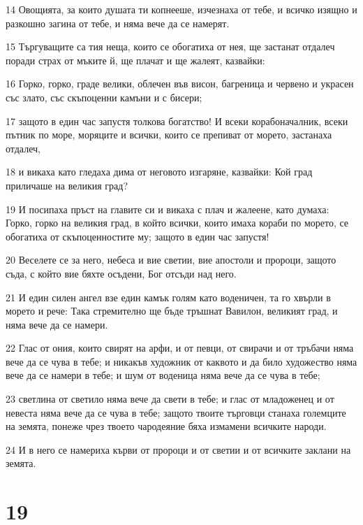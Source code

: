 \par 14 Овощията, за които душата ти копнееше, изчезнаха от тебе, и всичко изящно и разкошно загина от тебе, и няма вече да се намерят.
\par 15 Търгуващите са тия неща, които се обогатиха от нея, ще застанат отдалеч поради страх от мъките й, ще плачат и ще жалеят, казвайки:
\par 16 Горко, горко, граде велики, облечен във висон, багреница и червено и украсен със злато, със скъпоценни камъни и с бисери;
\par 17 защото в един час запустя толкова богатство! И всеки корабоначалник, всеки пътник по море, моряците и всички, които се препиват от морето, застанаха отдалеч,
\par 18 и викаха като гледаха дима от неговото изгаряне, казвайки: Кой град приличаше на великия град?
\par 19 И посипаха пръст на главите си и викаха с плач и жалеене, като думаха: Горко, горко на великия град, в който всички, които имаха кораби по морето, се обогатиха от скъпоценностите му; защото в един час запустя!
\par 20 Веселете се за него, небеса и вие светии, вие апостоли и пророци, защото съда, с който вие бяхте осъдени, Бог отсъди над него.
\par 21 И един силен ангел взе един камък голям като воденичен, та го хвърли в морето и рече: Така стремително ще бъде тръшнат Вавилон, великият град, и няма вече да се намери.
\par 22 Глас от ония, които свирят на арфи, и от певци, от свирачи и от тръбачи няма вече да се чува в тебе; и никакъв художник от каквото и да било художество няма вече да се намери в тебе; и шум от воденица няма вече да се чува в тебе;
\par 23 светлина от светило няма вече да свети в тебе; и глас от младоженец и от невеста няма вече да се чува в тебе; защото твоите търговци станаха големците на земята, понеже чрез твоето чародеяние бяха измамени всичките народи.
\par 24 И в него се намериха кърви от пророци и от светии и от всичките заклани на земята.

\chapter{19}

